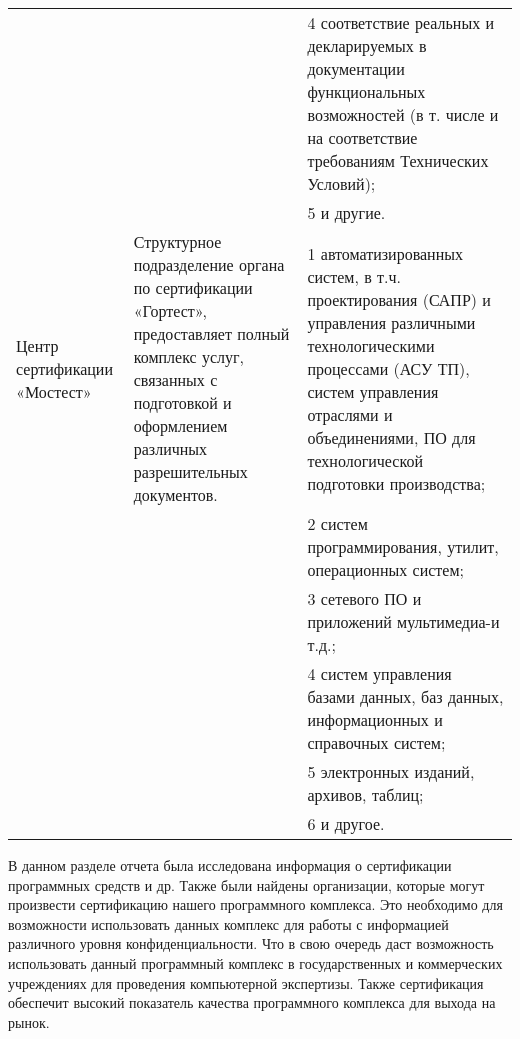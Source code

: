 \begin{center}
\begin{longtable}[h]{|*3{p{5cm}|}}
 & &4 соответствие реальных и декларируемых в документации функциональных возможностей (в т. числе и на соответствие требованиям Технических Условий);\\
 & &5 и другие.\\
\hline
Центр сертификации «Мостест» & Структурное подразделение органа по сертификации «Гортест», предоставляет полный комплекс услуг, связанных с подготовкой и оформлением различных разрешительных документов. & 1 автоматизированных систем, в т.ч. проектирования (САПР) и управления различными технологическими процессами (АСУ ТП), систем управления отраслями и объединениями, ПО для технологической подготовки производства;\\
 & & 2 систем программирования, утилит, операционных систем;\\
 & & 3 сетевого ПО и приложений мультимедиа-и т.д.;\\ 
 & &4 систем управления базами данных, баз данных, информационных и справочных систем;\\ 
 & &5 электронных изданий, архивов, таблиц;\\ 
 & &6 и другое.\\ 
\hline
\end{longtable}
\end{center}

В данном разделе отчета была исследована информация о сертификации программных средств и др. Также были найдены организации, которые могут произвести сертификацию нашего программного комплекса. Это необходимо для возможности использовать данных комплекс для работы с информацией различного уровня конфиденциальности. Что в свою очередь даст возможность использовать данный программный комплекс в государственных и коммерческих учреждениях для проведения компьютерной экспертизы. Также сертификация обеспечит высокий показатель качества программного комплекса для выхода на рынок.
